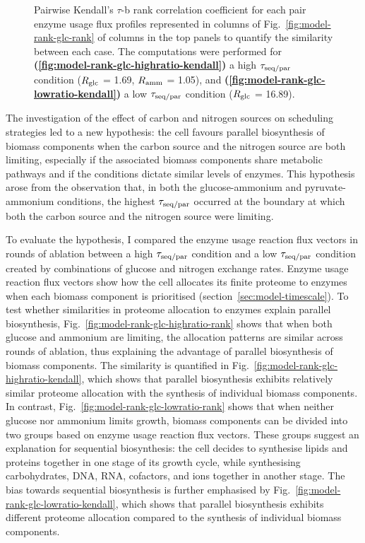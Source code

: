 \begin{figure}
  \caption[
    Pairwise Kendall's $\tau$-b rank correlation coefficient (glucose-ammonium)
  ]{
    Pairwise Kendall's $\tau$-b rank correlation coefficient \parencite{kendallTREATMENTTIESRANKING1945} for each pair enzyme usage flux profiles represented in columns of Fig.\ \ref{fig:model-rank-glc-rank} of columns in the top panels to quantify the similarity between each case.
    The computations were performed for \textbf{(\ref{fig:model-rank-glc-highratio-kendall})} a high $\tau_{\mathrm{seq}/\mathrm{par}}$ condition ($R_{\mathrm{glc}}$ = \SI{1.69}{\mmolgdwh}, $R_{\mathrm{amm}}$ = \SI{1.05}{\mmolgdwh}), and \textbf{(\ref{fig:model-rank-glc-lowratio-kendall})} a low $\tau_{\mathrm{seq}/\mathrm{par}}$ condition ($R_{\mathrm{glc}}$ = \SI{16.89}{\mmolgdwh}).
  }
  \label{fig:model-rank-glc-kendall}
\end{figure}

The investigation of the effect of carbon and nitrogen sources on scheduling strategies led to a new hypothesis: the cell favours parallel biosynthesis of biomass components when the carbon source and the nitrogen source are both limiting, especially if the associated biomass components share metabolic pathways and if the conditions dictate similar levels of enzymes.
This hypothesis arose from the observation that, in both the glucose-ammonium and pyruvate-ammonium conditions, the highest $\tau_{\mathrm{seq}/\mathrm{par}}$ occurred at the boundary at which both the carbon source and the nitrogen source were limiting.

To evaluate the hypothesis, I compared the enzyme usage reaction flux vectors in rounds of ablation between a high $\tau_{\mathrm{seq}/\mathrm{par}}$ condition and a low $\tau_{\mathrm{seq}/\mathrm{par}}$ condition created by combinations of glucose and nitrogen exchange rates.
Enzyme usage reaction flux vectors show how the cell allocates its finite proteome to enzymes when each biomass component is prioritised (section~\ref{sec:model-timescale}).
To test whether similarities in proteome allocation to enzymes explain parallel biosynthesis, Fig.\ \ref{fig:model-rank-glc-highratio-rank} shows that when both glucose and ammonium are limiting, the allocation patterns are similar across rounds of ablation, thus explaining the advantage of parallel biosynthesis of biomass components.
The similarity is quantified in Fig.\ \ref{fig:model-rank-glc-highratio-kendall}, which shows that parallel biosynthesis exhibits relatively similar proteome allocation with the synthesis of individual biomass components.
In contrast, Fig.\ \ref{fig:model-rank-glc-lowratio-rank} shows that when neither glucose nor ammonium limits growth, biomass components can be divided into two groups based on enzyme usage reaction flux vectors.
These groups suggest an explanation for sequential biosynthesis: the cell decides to synthesise lipids and proteins together in one stage of its growth cycle, while synthesising carbohydrates, DNA, RNA, cofactors, and ions together in another stage.
The bias towards sequential biosynthesis is further emphasised by Fig.\ \ref{fig:model-rank-glc-lowratio-kendall}, which shows that parallel biosynthesis exhibits different proteome allocation compared to the synthesis of individual biomass components.


